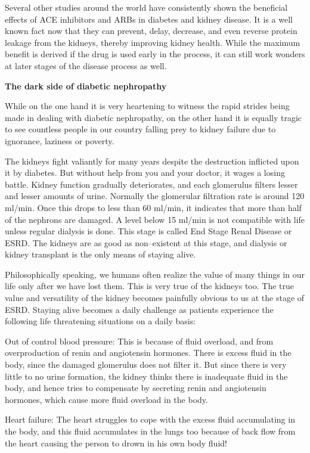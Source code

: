 Several other studies around the world have consistently shown the beneficial effects of ACE inhibitors and ARBs in diabetes and kidney disease. It is a well known fact now that they can prevent, delay, decrease, and even reverse protein leakage from the kidneys, thereby improving kidney health. While the maximum benefit is derived if the drug is used early in the process, it can still work wonders at later stages of the disease process as well.

\textbf{The dark side of diabetic nephropathy}

While on the one hand it is very heartening to witness the rapid strides being made in dealing with diabetic nephropathy, on the other hand it is equally tragic to see countless people in our country falling prey to kidney failure due to ignorance, laziness or poverty.

The kidneys fight valiantly for many years despite the destruction inflicted upon it by diabetes. But without help from you and your doctor, it wages a losing battle. Kidney function gradually deteriorates, and each glomerulus filters lesser and lesser amounts of urine. Normally the glomerular filtration rate is around 120 ml/min. Once this drops to less than 60 ml/min, it indicates that more than half of the nephrons are damaged. A level below 15 ml/min is not compatible with life unless regular dialysis is done. This stage is called End Stage Renal Disease or ESRD. The kidneys are as good as non–existent at this stage, and dialysis or kidney transplant is the only means of staying alive.

Philosophically speaking, we humans often realize the value of many things in our life only after we have lost them. This is very true of the kidneys too. The true value and versatility of the kidney becomes painfully obvious to us at the stage of ESRD. Staying alive becomes a daily challenge as patients experience the following life threatening situations on a daily basis:

\item Out of control blood pressure: This is because of fluid overload, and from overproduction of renin and angiotensin hormones. There is excess fluid in the body, since the damaged glomerulus does not filter it. But since there is very little to no urine formation, the kidney thinks there is inadequate fluid in the body, and hence tries to compensate by secreting renin and angiotensin hormones, which cause more fluid overload in the body.

 \item Heart failure: The heart struggles to cope with the excess fluid accumulating in the body, and this fluid accumulates in the lungs too because of back flow from the heart causing the person to drown in his own body fluid!

